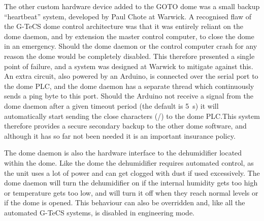 \begin{colsection}
The other custom hardware device added to the GOTO dome was a small backup ``heartbeat'' system, developed by Paul Chote at Warwick. A recognised flaw of the G-TeCS dome control architecture was that it was entirely reliant on the dome daemon, and by extension the master control computer, to close the dome in an emergency. Should the dome daemon or the control computer crash for any reason the dome would be completely disabled. This therefore presented a single point of failure, and a system was designed at Warwick to mitigate against this. An extra circuit, also powered by an Arduino, is connected over the serial port to the dome PLC, and the dome daemon has a separate thread which continuously sends a ping byte to this port. Should the Arduino not receive a signal from the dome daemon after a given timeout period (the default is \SI{5}{\second}) it will automatically start sending the close characters (/) to the dome PLC.\@ This system therefore provides a secure secondary backup to the other dome software, and although it has so far not been needed it is an important insurance policy.

The dome daemon is also the hardware interface to the dehumidifier located within the dome. Like the dome the dehumidifier requires automated control, as the unit uses a lot of power and can get clogged with dust if used excessively. The dome daemon will turn the dehumidifier on if the internal humidity gets too high or temperature gets too low, and will turn it off when they reach normal levels or if the dome is opened. This behaviour can also be overridden and, like all the automated G-TeCS systems, is disabled in engineering mode.

\end{colsection}


